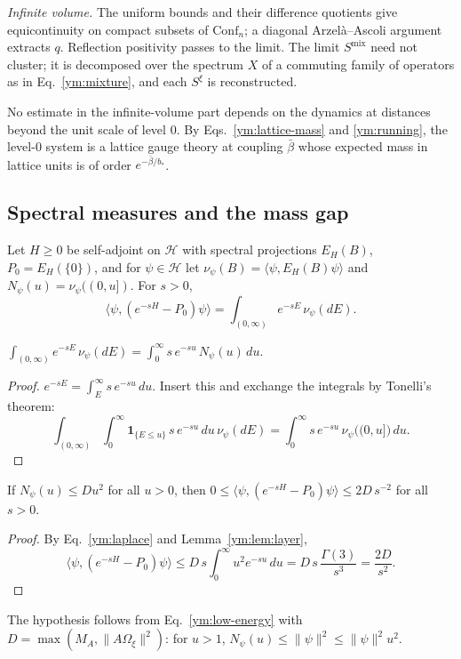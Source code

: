 \emph{Infinite volume.} The uniform bounds and their difference quotients
give equicontinuity on compact subsets of $\mathrm{Conf}_n$; a diagonal
Arzel\`a--Ascoli argument extracts $q$. Reflection positivity passes to the
limit. The limit $S^{\mathrm{mix}}$ need not cluster; it is decomposed over
the spectrum $X$ of a commuting family of operators as in
Eq.~\eqref{ym:mixture}, and each $S^\xi$ is reconstructed.

No estimate in the infinite-volume part depends on the dynamics at distances
beyond the unit scale of level $0$. By Eqs.~\eqref{ym:lattice-mass} and
\eqref{ym:running}, the level-$0$ system is a lattice gauge theory at
coupling $\bar\beta$ whose expected mass in lattice units is of order
$e^{-\bar\beta/b_*}$.

\subsection{Spectral measures and the mass gap}
Let $H\ge0$ be self-adjoint on $\mathcal H$ with spectral projections
$E_H(B)$, $P_0=E_H(\{0\})$, and for $\psi\in\mathcal H$ let
$\nu_\psi(B)=\langle\psi,E_H(B)\psi\rangle$ and
$N_\psi(u)=\nu_\psi((0,u])$. For $s>0$,
\begin{equation}\label{ym:laplace}
 \big\langle\psi,(e^{-sH}-P_0)\psi\big\rangle
 =\int_{(0,\infty)}e^{-sE}\,\nu_\psi(dE).
\end{equation}
\begin{lemma}\label{ym:lem:layer}
$\displaystyle\int_{(0,\infty)}e^{-sE}\,\nu_\psi(dE)
=\int_0^\infty s\,e^{-su}\,N_\psi(u)\,du$.
\end{lemma}
\begin{proof}
$e^{-sE}=\int_E^\infty s\,e^{-su}\,du$. Insert this and exchange the
integrals by Tonelli's theorem:
\begin{equation}
 \int_{(0,\infty)}\int_0^\infty\mathbf 1_{\{E\le u\}}\,s\,e^{-su}\,du\,
 \nu_\psi(dE)
 =\int_0^\infty s\,e^{-su}\,\nu_\psi\big((0,u]\big)\,du .
\end{equation}
\end{proof}
\begin{proposition}
\label{ym:prop:inverse-square}
If $N_\psi(u)\le Du^2$ for all $u>0$, then
$0\le\langle\psi,(e^{-sH}-P_0)\psi\rangle\le2D\,s^{-2}$ for all $s>0$.
\end{proposition}
\begin{proof}
By Eq.~\eqref{ym:laplace} and Lemma~\ref{ym:lem:layer},
\begin{equation}
 \big\langle\psi,(e^{-sH}-P_0)\psi\big\rangle
 \le D\,s\int_0^\infty u^2e^{-su}\,du
 =D\,s\,\frac{\Gamma(3)}{s^3}=\frac{2D}{s^2}.
\end{equation}
\end{proof}
The hypothesis follows from Eq.~\eqref{ym:low-energy} with
$D=\max(M_A,\|A\Omega_\xi\|^2)$: for $u>1$,
$N_\psi(u)\le\|\psi\|^2\le\|\psi\|^2u^2$.

